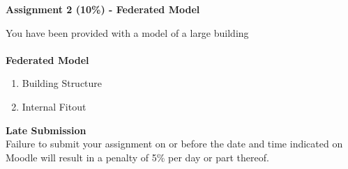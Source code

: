 
	
\begin{flushleft}
\Large\textbf{Assignment 2 (10\%) - Federated Model}\\
\end{flushleft}

You have been provided with a model of a large building\\
\\
\textbf{Federated Model}
\begin{enumerate}
	\item Building Structure
	\item Internal Fitout

\end{enumerate}


\textbf{Late Submission}\\
Failure to submit your assignment on or before the date and time indicated on Moodle will result in a penalty of 5\% per day or part thereof.  

